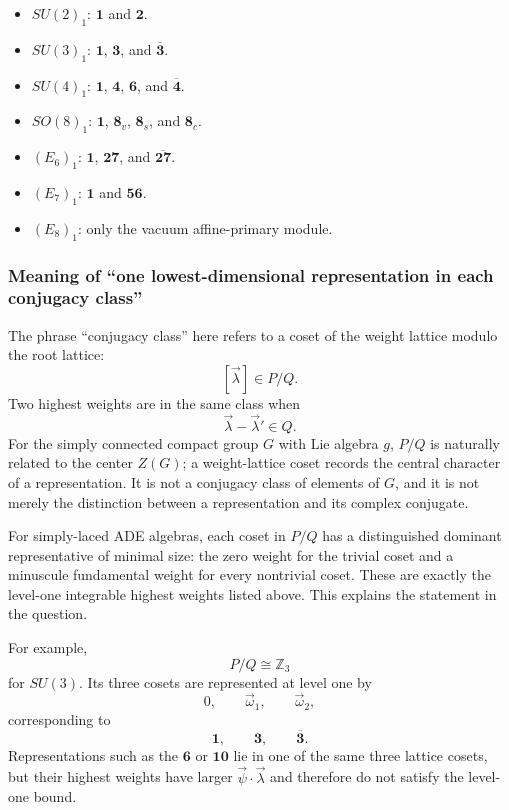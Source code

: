 \documentclass[
  10pt,
  a4paper,
  openany]{book}
\providecommand{\tightlist}{%
  \setlength{\itemsep}{0pt}\setlength{\parskip}{0pt}}
\begin{document}
\begin{itemize}
\tightlist
\item
  \(SU(2)_1\): \(\mathbf 1\) and \(\mathbf 2\).
\item
  \(SU(3)_1\): \(\mathbf 1\), \(\mathbf 3\), and
  \(\overline{\mathbf 3}\).
\item
  \(SU(4)_1\): \(\mathbf 1\), \(\mathbf 4\), \(\mathbf 6\), and
  \(\overline{\mathbf 4}\).
\item
  \(SO(8)_1\): \(\mathbf 1\), \(\mathbf 8_v\), \(\mathbf 8_s\), and
  \(\mathbf 8_c\).
\item
  \((E_6)_1\): \(\mathbf 1\), \(\mathbf{27}\), and
  \(\overline{\mathbf{27}}\).
\item
  \((E_7)_1\): \(\mathbf 1\) and \(\mathbf{56}\).
\item
  \((E_8)_1\): only the vacuum affine-primary module.
\end{itemize}

\subsubsection{Meaning of ``one lowest-dimensional representation in
each conjugacy
class''}\label{meaning-of-one-lowest-dimensional-representation-in-each-conjugacy-class}

The phrase ``conjugacy class'' here refers to a coset of the weight
lattice modulo the root lattice: \[
[\vec\lambda]\in P/Q.
\] Two highest weights are in the same class when \[
\vec\lambda-\vec\lambda'\in Q.
\] For the simply connected compact group \(G\) with Lie algebra \(g\),
\(P/Q\) is naturally related to the center \(Z(G)\); a weight-lattice
coset records the central character of a representation. It is not a
conjugacy class of elements of \(G\), and it is not merely the
distinction between a representation and its complex conjugate.

For simply-laced ADE algebras, each coset in \(P/Q\) has a distinguished
dominant representative of minimal size: the zero weight for the trivial
coset and a minuscule fundamental weight for every nontrivial coset.
These are exactly the level-one integrable highest weights listed above.
This explains the statement in the question.

For example, \[
P/Q\cong\mathbb Z_3
\] for \(SU(3)\). Its three cosets are represented at level one by \[
0,
\qquad
\vec\omega_1,
\qquad
\vec\omega_2,
\] corresponding to \[
\mathbf 1,
\qquad
\mathbf 3,
\qquad
\overline{\mathbf 3}.
\] Representations such as the \(\mathbf 6\) or \(\mathbf{10}\) lie in
one of the same three lattice cosets, but their highest weights have
larger \(\vec\psi\cdot\vec\lambda\) and therefore do not satisfy the
level-one bound.
\end{document}
